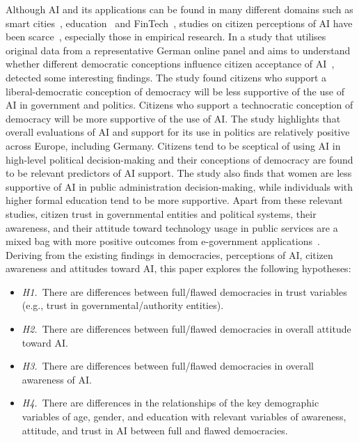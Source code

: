 \documentclass[
]{ceurart}
\begin{document}
Although AI and its applications can be found in many different domains such as smart cities~\cite{pham2016key}, education~\cite{mai2019students} and 
FinTech~\cite{nguyen2022cryptocurrency}, studies on citizen perceptions of AI have been scarce~\cite{konig2022citizen}, especially those in empirical research. In a study that utilises original data from a representative German online panel and aims to understand whether different democratic conceptions influence citizen acceptance of 
AI~\cite{konig2022citizen}, detected some interesting findings. The study found citizens who support a liberal-democratic conception of democracy will be less supportive of the use of AI in government and politics. Citizens who support a technocratic conception of democracy will be more supportive of the use of AI.
The study highlights that overall evaluations of AI and support for its use in politics are relatively positive across Europe, including Germany. Citizens tend to be sceptical of using AI in high-level political decision-making and their conceptions of democracy are found to be relevant predictors of AI support. The study also finds that women are less supportive of AI in public administration decision-making, while individuals with higher formal education tend to be more supportive. 
Apart from these relevant studies, citizen trust in governmental entities and political systems, their awareness, and their attitude toward technology usage in public services are a mixed bag with more positive outcomes from e-government applications~\cite{pena2020oecd, duberry2022artificial}. Deriving from the existing findings in democracies, perceptions of AI, citizen awareness and attitudes toward AI, this paper explores the following hypotheses:
\begin{itemize}
    \item \textit{H1.}~There are differences between full/flawed democracies in trust variables (e.g., trust in governmental/authority entities).
    \item \textit{H2.}~There are differences between full/flawed democracies in overall attitude toward AI. 
    \item  \textit{H3.}~There are differences between full/flawed democracies in overall awareness of AI.
    \item \textit{H4.}~There are differences in the relationships of the key demographic variables of age, gender, and education with relevant variables of awareness, attitude, and trust in AI between full and flawed democracies.
\end{itemize}
\end{document}
